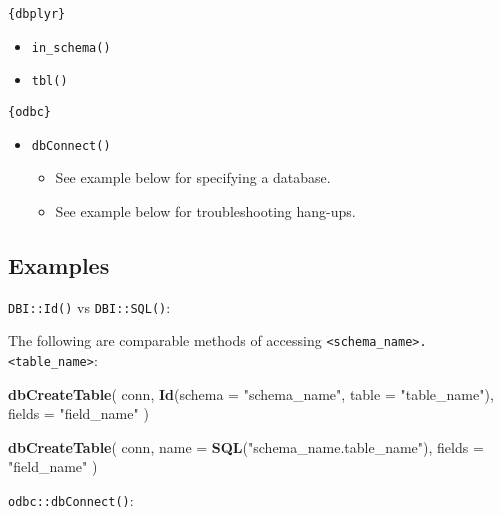 \documentclass[
]{book}
\newenvironment{Shaded}{\begin{snugshade}}{\end{snugshade}}
\newcommand{\DataTypeTok}[1]{\textcolor[rgb]{0.13,0.29,0.53}{#1}}
\newcommand{\KeywordTok}[1]{\textcolor[rgb]{0.13,0.29,0.53}{\textbf{#1}}}
\newcommand{\NormalTok}[1]{#1}
\newcommand{\StringTok}[1]{\textcolor[rgb]{0.31,0.60,0.02}{#1}}
\providecommand{\tightlist}{%
  \setlength{\itemsep}{0pt}\setlength{\parskip}{0pt}}
\begin{document}
\texttt{\{dbplyr\}}

\begin{itemize}
\tightlist
\item
  \texttt{in\_schema()}
\item
  \texttt{tbl()}
\end{itemize}

\texttt{\{odbc\}}

\begin{itemize}
\tightlist
\item
  \texttt{dbConnect()}

  \begin{itemize}
  \tightlist
  \item
    See example below for specifying a database.
  \item
    See example below for troubleshooting hang-ups.
  \end{itemize}
\end{itemize}

\hypertarget{examples-1}{%
\subsection{Examples}\label{examples-1}}

\texttt{DBI::Id()} vs \texttt{DBI::SQL()}:

The following are comparable methods of accessing \texttt{\textless{}schema\_name\textgreater{}.\textless{}table\_name\textgreater{}}:

\begin{Shaded}
\begin{Highlighting}[]
\KeywordTok{dbCreateTable}\NormalTok{(}
\NormalTok{  conn,}
  \KeywordTok{Id}\NormalTok{(}\DataTypeTok{schema =} \StringTok{"schema_name"}\NormalTok{, }\DataTypeTok{table =} \StringTok{"table_name"}\NormalTok{),}
  \DataTypeTok{fields =} \StringTok{"field_name"}
\NormalTok{)}

\KeywordTok{dbCreateTable}\NormalTok{(}
\NormalTok{  conn,}
  \DataTypeTok{name   =} \KeywordTok{SQL}\NormalTok{(}\StringTok{"schema_name.table_name"}\NormalTok{),}
  \DataTypeTok{fields =} \StringTok{"field_name"}
\NormalTok{)}
\end{Highlighting}
\end{Shaded}

\texttt{odbc::dbConnect()}:
\end{document}
